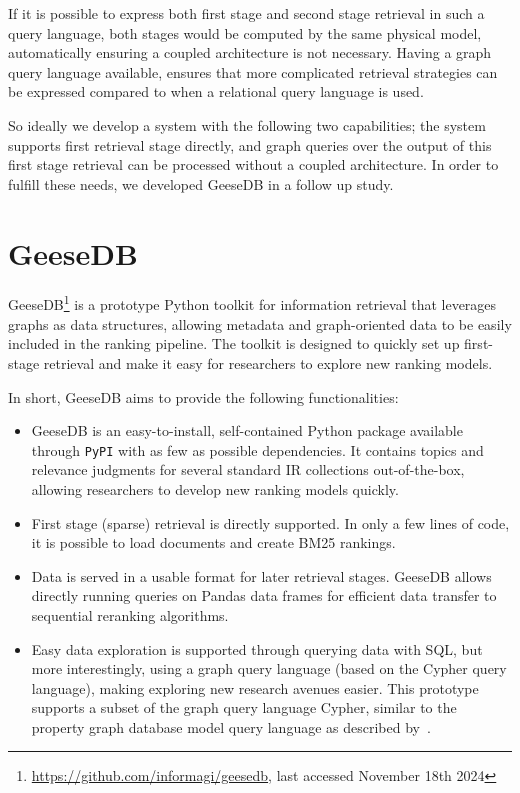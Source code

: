 If it is possible to express both first stage and second stage retrieval in such a query language, both stages would be computed by the same physical model, automatically ensuring a coupled architecture is not necessary. Having a graph query language available, ensures that more complicated retrieval strategies can be expressed compared to when a relational query language is used. 

So ideally we develop a system with the following two capabilities; the system supports first retrieval stage directly, and graph queries over the output of this first stage retrieval can be processed without a coupled architecture. In order to fulfill these needs, we developed GeeseDB in a follow up study. 

\section{GeeseDB}
GeeseDB\footnote{\url{https://github.com/informagi/geesedb}, last accessed November 18th 2024} is a prototype Python toolkit for information retrieval that leverages graphs as data structures, allowing metadata and graph-oriented data to be easily included in the ranking pipeline. The toolkit is designed to quickly set up first-stage retrieval and make it easy for researchers to explore new ranking models. 

In short, GeeseDB aims to provide the following functionalities:
\begin{itemize}
	\item GeeseDB is an easy-to-install, self-contained Python package available through \texttt{PyPI} with as few as possible dependencies. It contains topics and relevance judgments for several standard IR collections out-of-the-box, allowing researchers to develop new ranking models quickly. 
	\item First stage (sparse) retrieval is directly supported. In only a few lines of code, it is possible to load documents and create BM25 rankings. 
	\item Data is served in a usable format for later retrieval stages. GeeseDB allows directly running queries on Pandas data frames for efficient data transfer to sequential reranking algorithms.
	\item Easy data exploration is supported through querying data with SQL, but more interestingly, using a graph query language (based on the Cypher query language), making exploring new research avenues easier. This prototype supports a subset of the graph query language Cypher, similar to the property graph database model query language as described by~\citet{angles2018property}.
\end{itemize}

